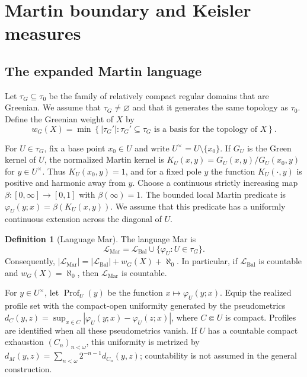 \documentclass{amsart}
\theoremstyle{definition}
\newtheorem{definition}{Definition}[section]
\theoremstyle{remark}
\numberwithin{equation}{section}
\begin{document}
\section{Martin boundary and Keisler measures}



\subsection{The expanded Martin language}

Let $\tau_G\subseteq\tau_0$ be the family of relatively compact regular domains that are
Greenian. We assume that $\tau_G\neq\varnothing$ and that it generates the same topology as $\tau_0$. Define the {Greenian weight} of $X$ by
$$
{w}_G(X)
=
\min\left\{
|\tau_G'|:
\tau_G'\subseteq\tau_G
\text{ is a basis for the topology of }X
\right\}.
$$


For $U\in\tau_G$, fix a base point $x_0\in U$ and
write $U^\times=U\setminus\{x_0\}$. If $G_U$ is the Green kernel of
$U$, the normalized Martin kernel is
$K_{U}(x,y)=G_U(x,y)/G_U(x_0,y)$ for $y\in U^\times$. Thus
$K_{U}(x_0,y)=1$, and for a fixed pole $y$ the function
$K_{U}(\cdot,y)$ is positive and harmonic away from $y$. Choose a continuous strictly increasing map
$\beta:[0,\infty]\to[0,1]$ with $\beta(\infty)=1$. The bounded local
Martin predicate is
$\varphi_{U}(y;x)=\beta(K_{U}(x,y))$. We assume that this predicate has a uniformly continuous extension across the diagonal of $U$. 

\begin{definition}[Language Mar]
	The language Mar is
	$$
	\mathcal L_{\mathrm{Mar}}
	=
	\mathcal L_{\mathrm{Bal}}
	\cup
	\{\varphi_U:U\in\tau_G\}.
	$$
	Consequently,
	$|\mathcal L_{\mathrm{Mar}}|=|\mathcal L_{\mathrm{Bal}}|+w_G(X)+\aleph_0$.
	In particular, if $\mathcal L_{\mathrm{Bal}}$ is countable and
	$w_G(X)=\aleph_0$, then
	$\mathcal L_{\mathrm{Mar}}$ is countable.
\end{definition}

For $y\in U^\times$, let $\operatorname{Prof}_U(y)$ be the function $x\mapsto\varphi_U(y;x)$. Equip the realized profile set with the compact-open uniformity generated by the pseudometrics $d_C(y,z)=\sup_{x\in C}|\varphi_U(y;x)-\varphi_U(z;x)|$, where $C\Subset U$ is compact. Profiles are identified when all these pseudometrics vanish. If $U$ has a countable compact exhaustion $(C_n)_{n<\omega}$, this uniformity is metrized by $d_M(y,z)=\sum_{n<\omega}2^{-n-1}d_{C_n}(y,z)$; countability is not assumed in the general construction.
\end{document}
